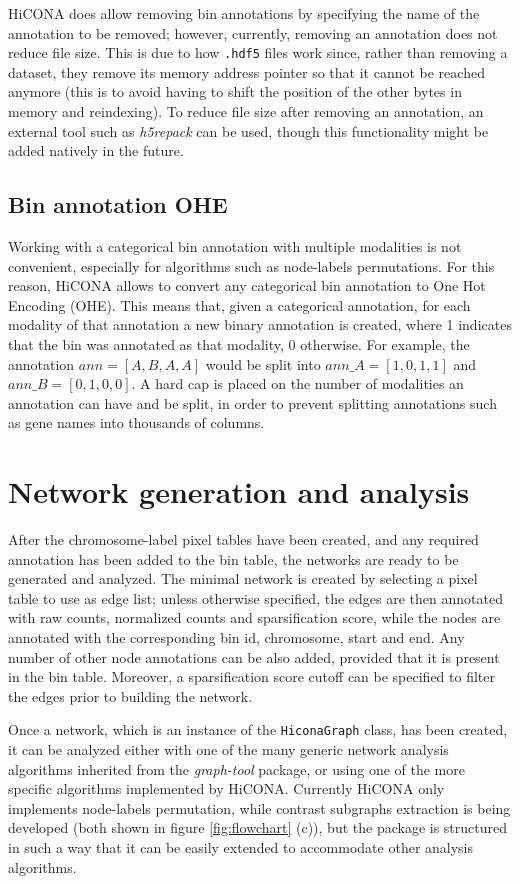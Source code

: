 HiCONA does allow removing bin annotations by specifying the name of the annotation to be removed; however, currently, removing an annotation does not reduce file size. This is due to how \texttt{.hdf5} files work since, rather than removing a dataset, they remove its memory address pointer so that it cannot be reached anymore (this is to avoid having to shift the position of the other bytes in memory and reindexing). To reduce file size after removing an annotation, an external tool such as \emph{h5repack} can be used, though this functionality might be added natively in the future.

\subsection{Bin annotation OHE}

Working with a categorical bin annotation with multiple modalities is not convenient, especially for algorithms such as node-labels permutations. For this reason, HiCONA allows to convert any categorical bin annotation to One Hot Encoding (OHE). This means that, given a categorical annotation, for each modality of that annotation a new binary annotation is created, where 1 indicates that the bin was annotated as that modality, 0 otherwise. For example, the annotation $ann=[A,B,A,A]$ would be split into $ann\_A=[1,0,1,1]$ and $ann\_B=[0,1,0,0]$. A hard cap is placed on the number of modalities an annotation can have and be split, in order to prevent splitting annotations such as gene names into thousands of columns.

\section{Network generation and analysis}

After the chromosome-label pixel tables have been created, and any required annotation has been added to the bin table, the networks are ready to be generated and analyzed. The minimal network is created by selecting a pixel table to use as edge list; unless otherwise specified, the edges are then annotated with raw counts, normalized counts and sparsification score, while the nodes are annotated with the corresponding bin id, chromosome, start and end. Any number of other node annotations can be also added, provided that it is present in the bin table. Moreover, a sparsification score cutoff can be specified to filter the edges prior to building the network.

Once a network, which is an instance of the \texttt{HiconaGraph} class, has been created, it can be analyzed either with one of the many generic network analysis algorithms inherited from the \emph{graph-tool} package, or using one of the more specific algorithms implemented by HiCONA. Currently HiCONA only implements node-labels permutation, while contrast subgraphs extraction is being developed (both shown in figure \ref{fig:flowchart} (c)), but the package is structured in such a way that it can be easily extended to accommodate other analysis algorithms.


